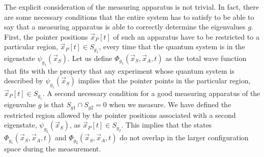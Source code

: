 \documentclass[onecolumn,nofootinbib, secnumarabic, amsmath, nobibnotes,12pt,aps,pra]{revtex4-1}
\begin{document}
The explicit consideration of the measuring apparatus is not
trivial. In fact, there are some necessary conditions that the
entire system has to satisfy to be able to say that a measuring
apparatus is able to correctly determine the eigenvalues $g$. First,
the pointer positions $\vec x_P[t]$ of such an apparatus have to be
restricted to a particular region, $\vec x_P[t]\in S_{g_1}$, every
time that the quantum system is in the eigenstate $\psi_{g_1}(\vec
x_S)$. Let us define $\Phi_{g_1}(\vec x_S,\vec x_A,t)$ as the total
wave function that fits with the property that any experiment whose
quantum system is described by $\psi_{g_1}(\vec x_S)$ implies that
the pointer points in the particular region, $\vec x_P[t]\in
S_{g_1}$. A second necessary condition for a good measuring
apparatus of the eigenvalue $g$ is that $S_{g1} \cap S_{g2} = 0$
when we measure. We have defined the restricted region
allowed by the pointer positions associated with a second
eigenstate, $\psi_{g_2}(\vec x_S)$, as $\vec x_P[t]\in S_{g_2}$.
This implies that the states $\Phi_{g_1}(\vec x_S,\vec x_A,t)$ and
$\Phi_{g_2}(\vec x_S,\vec x_A,t)$ do not overlap in the larger
configuration space during the measurement.
\end{document}
